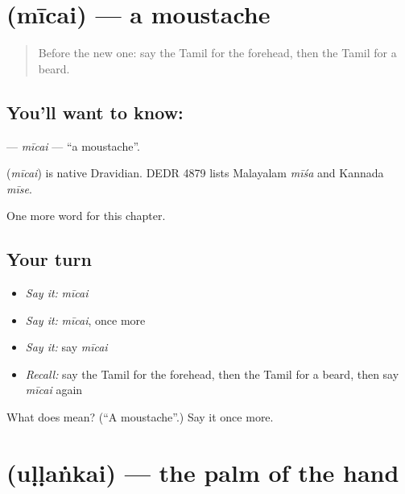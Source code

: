 \section[\texorpdfstring{\ta{மீசை} (mīcai)}{மீசை (mīcai)}]{ (mīcai) — a moustache}

\label{lesson:TA-C201-micai}



\begin{quote}
Before the new one: say the Tamil for the forehead, then the Tamil for a beard.
\end{quote}

\subsection*{You'll want to know: }
\textbf{} — \emph{mīcai} — \textquotedblleft{}a moustache\textquotedblright{}.

\begin{cousinweb}
\textbf{} (\emph{mīcai}) is native Dravidian. DEDR 4879 lists Malayalam \emph{mīśa} and Kannada \emph{mīse}.
\end{cousinweb}

\begin{grammarlens}[title={What you've built}]
One more word for this chapter.
\end{grammarlens}

\subsection*{Your turn}
\begin{itemize}
\raggedright
  \item \emph{Say it:} \emph{mīcai}
  \item \emph{Say it:} \emph{mīcai}, once more
  \item \emph{Say it:} say \emph{mīcai}
  \item \emph{Recall:} say the Tamil for the forehead, then the Tamil for a beard, then say \emph{mīcai} again
\end{itemize}

\begin{tcolorbox}[breakable,colback=teal!4,colframe=teal!35!black,title={Before you move on}]
What does  mean? (\textquotedblleft{}A moustache\textquotedblright{}.) Say it once more.
\end{tcolorbox}
\section[\texorpdfstring{\ta{உள்ளங்கை} (uḷḷaṅkai)}{உள்ளங்கை (uḷḷaṅkai)}]{ (uḷḷaṅkai) — the palm of the hand}

